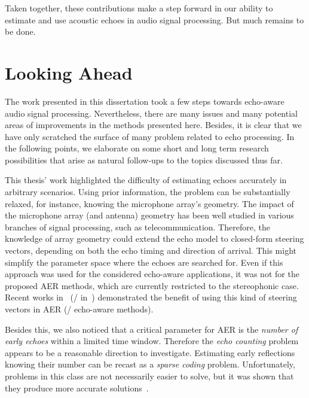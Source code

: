 \begin{itemize}
\begin{itemize}[label={\scriptsize\faCode}]
    \end{itemize}

\end{itemize}

\mynewline
Taken together, these contributions make a step forward in our ability to estimate and use acoustic echoes in audio signal processing.
But much remains to be done.

\section{Looking Ahead}
The work presented in this dissertation took a few steps towards echo-aware audio signal processing.
Nevertheless, there are many issues and many potential areas of improvements in the methods presented here.
Besides, it is clear that we have only scratched the surface of many problem related to echo processing.
In the following points, we elaborate on some short and long term research possibilities that arise as natural follow-ups to the topics discussed thus far.


This thesis' work highlighted the difficulty of estimating echoes accurately in arbitrary scenarios.
Using prior information, the problem can be substantially relaxed, for instance, knowing the microphone array's geometry.
The impact of the microphone array (and antenna) geometry has been well studied in various branches of signal processing, such as telecommunication.
Therefore, the knowledge of array geometry could extend the echo model to closed-form steering vectors, depending on both the echo timing and direction of arrival.
This might simplify the parameter space where the echoes are searched for.
Even if this approach was used for the considered echo-aware applications, it was not for the proposed \ac{AER} methods, which are currently restricted to the stereophonic case.
Recent works in~ (\resp/ in~) demonstrated the benefit of using this kind of steering vectors in \ac{AER} (\resp/ echo-aware methods).

\mynewline
Besides this, we also noticed that a critical parameter for \ac{AER} is the \textit{number of early echoes} within a limited time window.
Therefore the \textit{echo counting} problem appears to be a reasonable direction to investigate.
Estimating early reflections knowing their number can be recast as a \textit{sparse coding} problem.
Unfortunately, problems in this class are not necessarily easier to solve, but it was shown that they produce more accurate solutions~.

